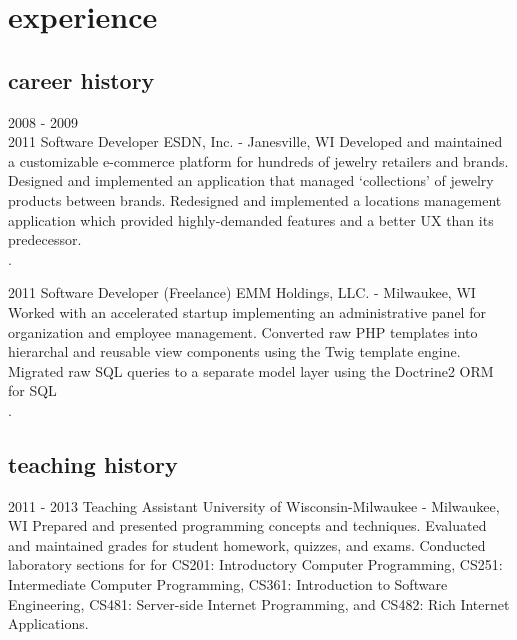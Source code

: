 \documentclass[]{fritz-resume}
\begin{document}

\section{experience}

\subsection{career history}

\begin{entrylist}
  \entry
    {2008 - 2009 \\ 2011}
    {Software Developer}
    {ESDN, Inc. - Janesville, WI}
    {
      Developed and maintained a customizable e-commerce platform for hundreds of jewelry retailers and brands. Designed and implemented an application that managed `collections' of jewelry products between brands. Redesigned and implemented a locations management application which provided highly-demanded features and a better UX than its predecessor. \\ .
    }

  \entry
    {2011}
    {Software Developer (Freelance)}
    {EMM Holdings, LLC. - Milwaukee, WI}
    {
      Worked with an accelerated startup implementing an administrative panel for organization and employee management. Converted raw PHP templates into hierarchal and reusable view components using the Twig template engine. Migrated raw SQL queries to a separate model layer using the Doctrine2 ORM for SQL \\ .
    }
\end{entrylist}

\subsection{teaching history}

\begin{entrylist}
  \entry
    {2011 - 2013}
    {Teaching Assistant}
    {University of Wisconsin-Milwaukee - Milwaukee, WI}
    {
      Prepared and presented programming concepts and techniques. Evaluated and maintained grades for student homework, quizzes, and exams. Conducted laboratory sections for for CS201: Introductory Computer Programming, CS251: Intermediate Computer Programming, CS361: Introduction to Software Engineering, CS481: Server-side Internet Programming, and CS482: Rich Internet Applications.
    }
\end{entrylist}
\end{document}
